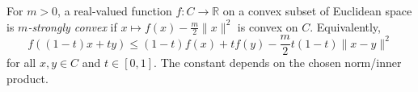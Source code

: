 
For $m>0$, a real-valued function $f:C\to\mathbb R$ on a convex subset of Euclidean space is \emph{$m$-strongly convex} if $x\mapsto f(x)-\frac m2\|x\|^2$ is convex on $C$. Equivalently,
\[
f((1-t)x+ty)\le(1-t)f(x)+tf(y)-\frac m2t(1-t)\|x-y\|^2
\]
for all $x,y\in C$ and $t\in[0,1]$. The constant depends on the chosen norm/inner product.
